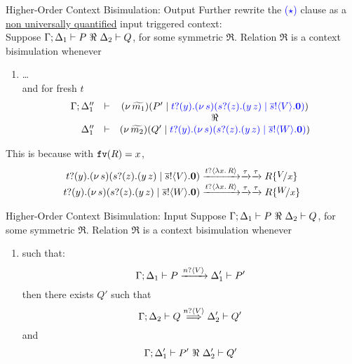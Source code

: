 \documentclass{beamer}
\newcommand{\prcolor}[1]{{\color{blue} #1}}
\begin{document}
	\begin{frame}{Higher-Order Context Bisimulation: Output}
		Further rewrite the \textcolor{blue}{($\star$)} clause as a \underline{non universally quantified} input triggered context:
		\\[2mm]

		Suppose $\Gamma; \Delta_1 \proves P\ \Re\ \Delta_2 \proves Q$, for some symmetric $\Re$. Relation $\Re$ is
		a context bisimulation whenever
		\begin{enumerate}[$(\star)$]
			\item
				\dots\\
				and for fresh $t$
				\[
					\begin{array}{rcc}
						\Gamma; \Delta_1'' &\proves& \newsp{\widetilde{m_1}}{P' \Par \prcolor{\binp{t}{y}\newsp{s}{\binp{s}{z} (\appl{y}{z}) \Par \bout{\dual{s}}{V} \inact}}}
						\\
						&& \Re
						\\
						\Delta_1'' &\proves& \newsp{\widetilde{m_2}}{Q' \Par \prcolor{\binp{t}{y}\newsp{s}{\binp{s}{z} (\appl{y}{z}) \Par \bout{\dual{s}}{W} \inact}}}
					\end{array}
				\]
		\end{enumerate}

		This is because  with $\mathtt{fv}(R)=x$, 
		\[
			\begin{array}{c}
				\binp{t}{y}\newsp{s}{\binp{s}{z} (\appl{y}{z}) \Par \bout{\dual{s}}{V} \inact}
				\by{\bactinp{t}{\abs{x}{R}}} \by{\tau} \by{\tau}
				R \subst{V}{x}
				\\
				\binp{t}{y}\newsp{s}{\binp{s}{z} (\appl{y}{z}) \Par \bout{\dual{s}}{W} \inact}
				\by{\bactinp{t}{\abs{x}{R}}} \by{\tau} \by{\tau}
				R \subst{W}{x}
			\end{array}
		\]
	\end{frame}

	\begin{frame}{Higher-Order Context Bisimulation: Input}
		Suppose $\Gamma; \Delta_1 \proves P\ \Re\ \Delta_2 \proves Q$, for some symmetric $\Re$. Relation $\Re$ is
		a context bisimulation whenever
		\begin{enumerate}[$(\bullet)$]
			\item	{} such that:
				\[
					\Gamma; \Delta_1 \vdash P \xrightarrow{n ? \langle V \rangle} \Delta_1' \vdash P'
				\]
				then there exists $Q'$ such that
				\[
					\Gamma; \Delta_2 \vdash Q \stackrel{n ? \langle V \rangle}{\Longrightarrow} \Delta_2' \vdash Q'
				\]
				and
				\[
					\Gamma; \Delta_1' \vdash P'\ \Re\ \Delta_2' \vdash Q'
				\]
		\end{enumerate}
	\end{frame}
\end{document}
